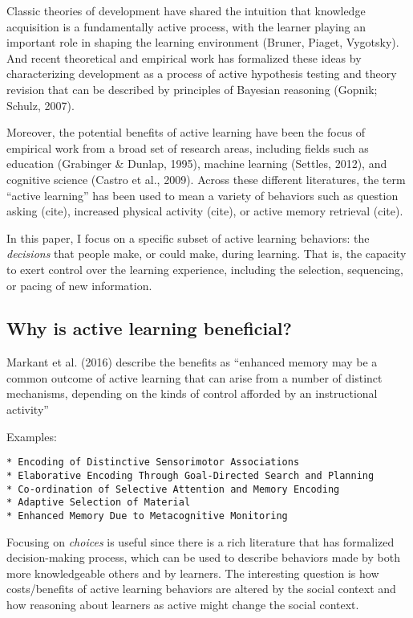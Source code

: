 \documentclass[a4paper,man,apacite,floatsintext]{apa6}
\begin{document}
Classic theories of development have shared the intuition that knowledge
acquisition is a fundamentally active process, with the learner playing
an important role in shaping the learning environment (Bruner, Piaget,
Vygotsky). And recent theoretical and empirical work has formalized
these ideas by characterizing development as a process of active
hypothesis testing and theory revision that can be described by
principles of Bayesian reasoning (Gopnik; Schulz, 2007).

Moreover, the potential benefits of active learning have been the focus
of empirical work from a broad set of research areas, including fields
such as education (Grabinger \& Dunlap, 1995), machine learning
(Settles, 2012), and cognitive science (Castro et al., 2009). Across
these different literatures, the term ``active learning'' has been used
to mean a variety of behaviors such as question asking (cite), increased
physical activity (cite), or active memory retrieval (cite).

In this paper, I focus on a specific subset of active learning
behaviors: the \emph{decisions} that people make, or could make, during
learning. That is, the capacity to exert control over the learning
experience, including the selection, sequencing, or pacing of new
information.

\subsection{Why is active learning
beneficial?}\label{why-is-active-learning-beneficial}

Markant et al. (2016) describe the benefits as ``enhanced memory may be
a common outcome of active learning that can arise from a number of
distinct mechanisms, depending on the kinds of control afforded by an
instructional activity''

Examples:

\begin{verbatim}
* Encoding of Distinctive Sensorimotor Associations
* Elaborative Encoding Through Goal-Directed Search and Planning
* Co-ordination of Selective Attention and Memory Encoding
* Adaptive Selection of Material
* Enhanced Memory Due to Metacognitive Monitoring 
\end{verbatim}

Focusing on \emph{choices} is useful since there is a rich literature
that has formalized decision-making process, which can be used to
describe behaviors made by both more knowledgeable others and by
learners. The interesting question is how costs/benefits of active
learning behaviors are altered by the social context and how reasoning
about learners as active might change the social context.
\end{document}
